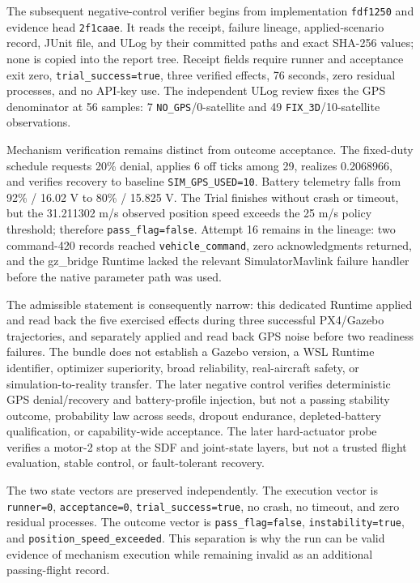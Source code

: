 The subsequent negative-control verifier begins from implementation
\texttt{fdf1250} and evidence head \texttt{2f1caae}. It reads the
receipt, failure lineage, applied-scenario record, JUnit file, and ULog by
their committed paths and exact SHA-256 values; none is copied into the
report tree. Receipt fields require runner and acceptance exit zero,
\texttt{trial\_success=true}, three verified effects, 76 seconds, zero
residual processes, and no API-key use. The independent ULog review fixes
the GPS denominator at 56 samples: 7 \texttt{NO\_GPS}/0-satellite and 49
\texttt{FIX\_3D}/10-satellite observations.

Mechanism verification remains distinct from outcome acceptance. The
fixed-duty schedule requests 20\% denial, applies 6 off ticks among 29,
realizes 0.2068966, and verifies recovery to baseline
\texttt{SIM\_GPS\_USED=10}. Battery telemetry falls from 92\% / 16.02 V
to 80\% / 15.825 V. The Trial finishes without crash or timeout, but the
31.211302 m/s observed position speed exceeds the 25 m/s policy threshold;
therefore \texttt{pass\_flag=false}. Attempt 16 remains in the lineage:
two command-420 records reached \texttt{vehicle\_command}, zero
acknowledgments returned, and the gz\_bridge Runtime lacked the relevant
SimulatorMavlink failure handler before the native parameter path was used.

The admissible statement is consequently narrow: this dedicated Runtime
applied and read back the five exercised effects during three successful
PX4/Gazebo trajectories, and separately applied and read back GPS noise
before two readiness failures. The bundle does not establish a Gazebo
version, a WSL Runtime identifier, optimizer superiority, broad
reliability, real-aircraft safety, or simulation-to-reality transfer.
The later negative control verifies deterministic GPS denial/recovery and
battery-profile injection, but not a passing stability outcome, probability
law across seeds, dropout endurance, depleted-battery qualification, or
capability-wide acceptance. The later hard-actuator probe verifies a
motor-2 stop at the SDF and joint-state layers, but not a trusted flight
evaluation, stable control, or fault-tolerant recovery.

The two state vectors are preserved independently. The execution vector is
\texttt{runner=0}, \texttt{acceptance=0},
\texttt{trial\_success=true}, no crash, no timeout, and zero residual
processes. The outcome vector is \texttt{pass\_flag=false},
\texttt{instability=true}, and
\texttt{position\_speed\_exceeded}. This separation is why the run can be
valid evidence of mechanism execution while remaining invalid as an
additional passing-flight record.

